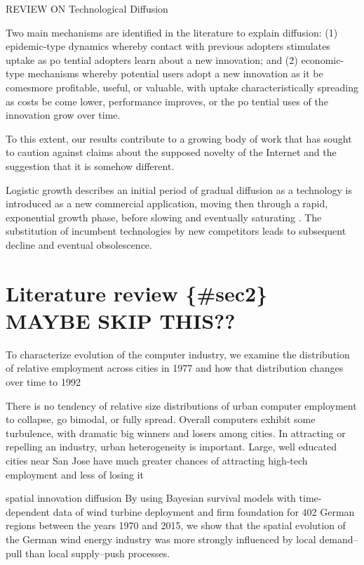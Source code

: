 \documentclass[preprint, 3p,
authoryear]{elsarticle} %
\begin{document}
\citet{ding2010modeling} REVIEW ON Technological Diffusion

\citet{perkins2011internet} Two main mechanisms are identified in the
literature to explain diffusion: (1) epidemic-type dynamics whereby
contact with previous adopters stimulates uptake as po tential adopters
learn about a new innovation; and (2) economic-type mechanisms whereby
potential users adopt a new innovation as it be comesmore profitable,
useful, or valuable, with uptake characteristically spreading as costs
be come lower, performance improves, or the po tential uses of the
innovation grow over time.

To this extent, our results contribute to a growing body of work that
has sought to caution against claims about the supposed novelty of the
Internet and the suggestion that it is somehow different.

\citet{wilson201281} Logistic growth describes an initial period of
gradual diffusion as a technology is introduced as a new commercial
application, moving then through a rapid, exponential growth phase,
before slowing and eventually saturating \citep{grubler1999dynamics}.
The substitution of incumbent technologies by new competitors leads to
subsequent decline and eventual obsolescence.

\hypertarget{literature-review-sec2-maybe-skip-this}{%
\section{Literature review \{\#sec2\} MAYBE SKIP
THIS??}\label{literature-review-sec2-maybe-skip-this}}

\citet{beardsell1999spatial} To characterize evolution of the computer
industry, we examine the distribution of relative employment across
cities in 1977 and how that distribution changes over time to 1992

There is no tendency of relative size distributions of urban computer
employment to collapse, go bimodal, or fully spread. Overall computers
exhibit some turbulence, with dramatic big winners and losers among
cities. In attracting or repelling an industry, urban heterogeneity is
important. Large, well educated cities near San Jose have much greater
chances of attracting high-tech employment and less of losing it

\citet{bednarz2020pulled} spatial innovation diffusion By using Bayesian
survival models with time-dependent data of wind turbine deployment and
firm foundation for 402 German regions between the years 1970 and 2015,
we show that the spatial evolution of the German wind energy industry
was more strongly influenced by local demand-- pull than local
supply--push processes.
\end{document}
